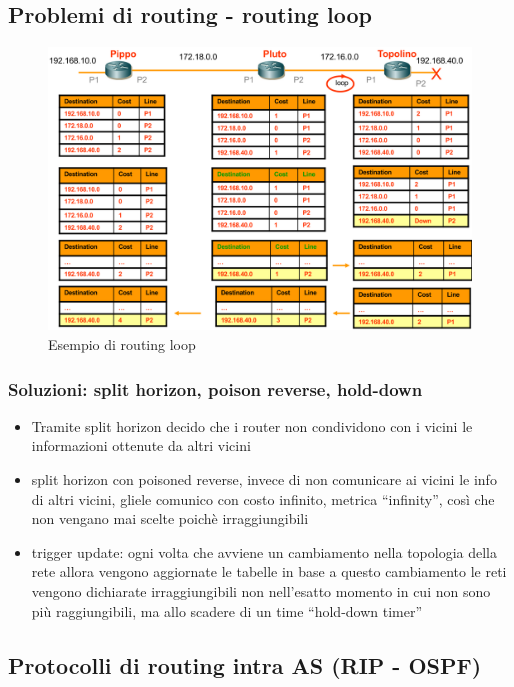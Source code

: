 \newpage

\subsection{Problemi di routing - routing loop}
\begin{figure}[h!]
    \centering
    \includegraphics[width=1\textwidth]{images/problemaloop.png}
    \caption{Esempio di routing loop}
    \label{fig:problemaloop}
\end{figure}
\subsubsection{Soluzioni: split horizon, poison reverse, hold-down}
\begin{itemize}
    \item Tramite split horizon decido che i router non condividono con i vicini le informazioni ottenute da altri vicini
    \item split horizon con poisoned reverse, invece di non comunicare ai vicini le info di altri vicini, gliele comunico con costo infinito, metrica “infinity”, così che non vengano mai scelte poichè irraggiungibili
    \item trigger update: ogni volta che avviene un cambiamento nella topologia della rete allora vengono aggiornate le tabelle in base a questo cambiamento 
le reti vengono dichiarate irraggiungibili non nell'esatto momento in cui non sono più raggiungibili, ma allo scadere di un time “hold-down timer” 
\end{itemize}

\newpage
\subsection{Protocolli di routing intra AS (RIP - OSPF)}

